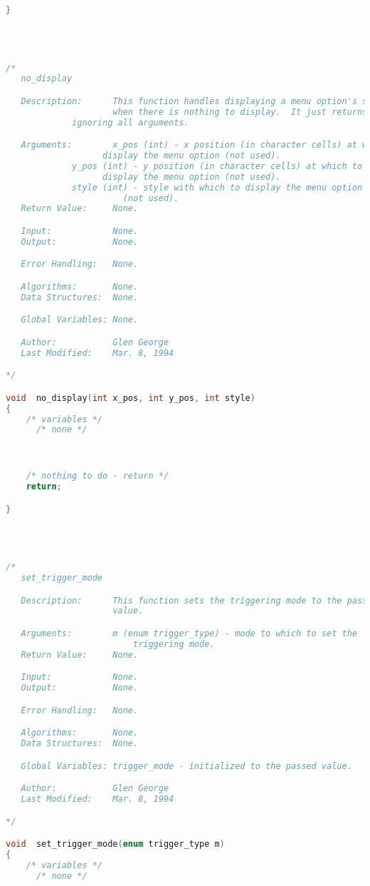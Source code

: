 \begin{lstlisting}[language=C]
}




/*
   no_display

   Description:      This function handles displaying a menu option's setting
                     when there is nothing to display.  It just returns,
		     ignoring all arguments.

   Arguments:        x_pos (int) - x position (in character cells) at which to
   				   display the menu option (not used).
   		     y_pos (int) - y position (in character cells) at which to
   				   display the menu option (not used).
		     style (int) - style with which to display the menu option
		     		   (not used).
   Return Value:     None.

   Input:            None.
   Output:           None.

   Error Handling:   None.

   Algorithms:       None.
   Data Structures:  None.

   Global Variables: None.

   Author:           Glen George
   Last Modified:    Mar. 8, 1994

*/

void  no_display(int x_pos, int y_pos, int style)
{
    /* variables */
      /* none */



    /* nothing to do - return */
    return;

}




/*
   set_trigger_mode

   Description:      This function sets the triggering mode to the passed
                     value.

   Arguments:        m (enum trigger_type) - mode to which to set the
   					     triggering mode.
   Return Value:     None.

   Input:            None.
   Output:           None.

   Error Handling:   None.

   Algorithms:       None.
   Data Structures:  None.

   Global Variables: trigger_mode - initialized to the passed value.

   Author:           Glen George
   Last Modified:    Mar. 8, 1994

*/

void  set_trigger_mode(enum trigger_type m)
{
    /* variables */
      /* none */




\end{lstlisting}
